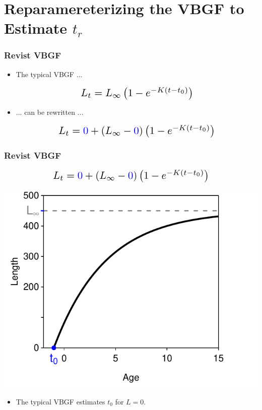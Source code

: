 \documentclass[xcolor=dvipsnames]{beamer}\usepackage[]{graphicx}\usepackage[]{color}
\makeatletter
\newenvironment{knitrout}{}{} %
\newcommand*{\Scale}[2][4]{\scalebox{#1}{\ensuremath{#2}}}%
\def\mathcolor#1#{\@mathcolor{#1}}
\def\@mathcolor#1#2#3{%
  \protect\leavevmode
  \begingroup
    \color#1{#2}#3%
  \endgroup
}
\makeatother
\begin{document}
\section{Reparamereterizing the VBGF to Estimate $t_{r}$}


\begin{frame}[fragile, t]
\frametitle{Revist VBGF}
\begin{itemize}
\item The typical VBGF ...

\[\Scale[1.5]{ L_{t} = L_{\infty}\left(1-e^{-K(t-t_{0})}\right) }\]

\bigskip
\item ... can be rewritten ...

\[\Scale[1.5]{ L_{t} = \mathcolor{blue}{0} + (L_{\infty}-\mathcolor{blue}{0})\left(1-e^{-K(t-t_{0})}\right) }\]
\end{itemize}
\end{frame}


\begin{frame}
\frametitle{Revist VBGF}
\vspace{-14pt}
\[\Scale[1.5]{ L_{t} = \mathcolor{blue}{0} + (L_{\infty}-\mathcolor{blue}{0})\left(1-e^{-K(t-t_{0})}\right) }\]
\vspace{14pt}

\begin{knitrout}\footnotesize
{}\color{fgcolor}

{\centering \includegraphics[width=.5\linewidth]{Figs/redefineB-1} 

}



\end{knitrout}

\begin{itemize}
  \item The typical VBGF estimates $t_{0}$ for $L=0$.
\end{itemize}
\end{frame}
\end{document}

